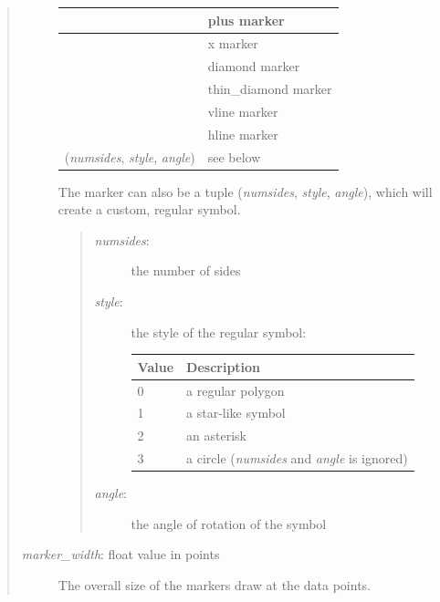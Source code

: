 \documentclass[letterpaper,10pt,english]{sphinxmanual}
\begin{document}
\begin{fulllineitems}
\begin{fulllineitems}
\begin{quote}
\begin{description}
\begin{tabulary}{\linewidth}{|L|L|}
 & 
plus marker
\\\hline

 & 
x marker
\\\hline

 & 
diamond marker
\\\hline

 & 
thin\_diamond marker
\\\hline

 & 
vline marker
\\\hline

 & 
hline marker
\\\hline

(\emph{numsides}, \emph{style}, \emph{angle})
 & 
see below
\\\hline
\end{tabulary}


The marker can also be a tuple (\emph{numsides}, \emph{style}, \emph{angle}), 
which will create a custom, regular symbol.
\begin{quote}
\begin{description}
\item[{\emph{numsides}:}] \leavevmode
the number of sides

\item[{\emph{style}:}] \leavevmode
the style of the regular symbol:

\begin{tabulary}{\linewidth}{|L|L|}
\hline
\textbf{
Value
} & \textbf{
Description
}\\\hline

0
 & 
a regular polygon
\\\hline

1
 & 
a star-like symbol
\\\hline

2
 & 
an asterisk
\\\hline

3
 & 
a circle (\emph{numsides} and \emph{angle} is ignored)
\\\hline
\end{tabulary}


\item[{\emph{angle}:}] \leavevmode
the angle of rotation of the symbol

\end{description}
\end{quote}

\item[{\emph{marker\_width}: float value in points}] \leavevmode
The overall size of the markers draw at the data points.


\end{description}
\end{quote}
\end{fulllineitems}
\end{fulllineitems}
\end{document}
